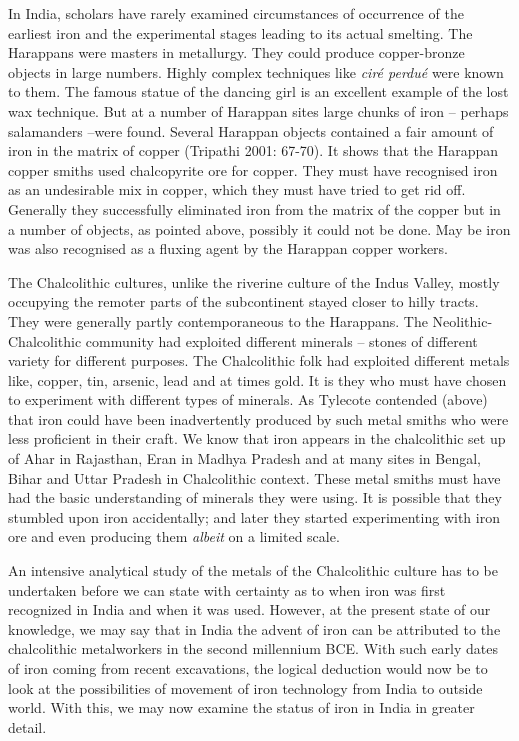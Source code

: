 In India, scholars have rarely examined circumstances of occurrence of the earliest iron and the experimental stages leading to its actual smelting. The Harappans were masters in metallurgy. They could produce copper-bronze objects in large numbers. Highly complex techniques like \textit{ciré perdué} were known to them. The famous statue of the dancing girl is an excellent example of the lost wax technique. But at a number of Harappan sites large chunks of iron – perhaps salamanders –were found. Several Harappan objects contained a fair amount of iron in the matrix of copper (Tripathi 2001: 67-70). It shows that the Harappan copper smiths used chalcopyrite ore for copper. They must have recognised iron as an undesirable mix in copper, which they must have tried to get rid off. Generally they successfully eliminated iron from the matrix of the copper but in a number of objects, as pointed above, possibly it could not be done. May be iron was also recognised as a fluxing agent by the Harappan copper workers.

The Chalcolithic cultures, unlike the riverine culture of the Indus Valley, mostly occupying the remoter parts of the subcontinent stayed closer to hilly tracts. They were generally partly contemporaneous to the Harappans. The Neolithic-Chalcolithic community had exploited different minerals – stones of different variety for different purposes. The Chalcolithic folk had exploited different metals like, copper, tin, arsenic, lead and at times gold. It is they who must have chosen to experiment with different types of minerals. As Tylecote contended (above) that iron could have been inadvertently produced by such metal smiths who were less proficient in their craft. We know that iron appears in the chalcolithic set up of Ahar in Rajasthan, Eran in Madhya Pradesh and at many sites in Bengal, Bihar and Uttar Pradesh in Chalcolithic context. These metal smiths must have had the basic understanding of minerals they were using. It is possible that they stumbled upon iron accidentally; and later they started experimenting with iron ore and even producing them \textit{albeit} on a limited scale.

An intensive analytical study of the metals of the Chalcolithic culture has to be undertaken before we can state with certainty as to when iron was first recognized in India and when it was used. However, at the present state of our knowledge, we may say that in India the advent of iron can be attributed to the chalcolithic metalworkers in the second millennium BCE. With such early dates of iron coming from recent excavations, the logical deduction would now be to look at the possibilities of movement of iron technology from India to outside world. With this, we may now examine the status of iron in India in greater detail.


